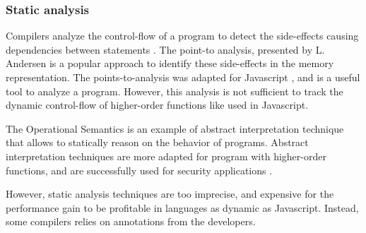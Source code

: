 


\subsubsection{Static analysis}


Compilers analyze the control-flow of a program to detect the side-effects causing dependencies between statements \cite{Allen1970}.
The point-to analysis, presented by L. Andersen \cite{Andersen1994} is a popular approach to identify these side-effects in the memory representation.
The points-to-analysis was adapted for Javascript \cite{Jang2009,Sridharan2012,Wei2014}, and is a useful tool to analyze a program.
However, this analysis is not sufficient to track the dynamic control-flow of higher-order functions \cite{Shivers1991} like used in Javascript.

The Operational Semantics is an example of abstract interpretation technique that allows to statically reason on the behavior of programs\cite{Maffeis2008,Smith2011,Gardner2012,Gardner2013,Bodin2014}.
Abstract interpretation techniques are more adapted for program with higher-order functions, and are successfully used for security applications \cite{Huang2004,Jovanovic2006,Yu2007,Maffeis2009a,Chudnov2015,Dolby2015}.

However, static analysis techniques are too imprecise, and expensive for the performance gain to be profitable in languages as dynamic as Javascript.
Instead, some compilers relies on annotations from the developers.


